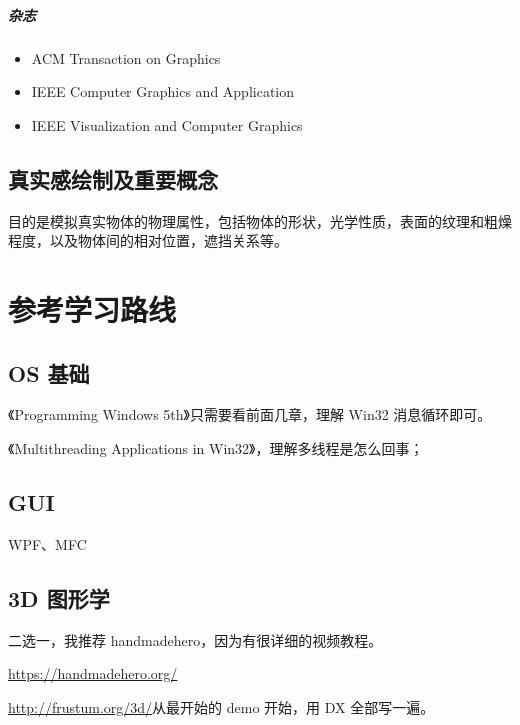 \documentclass[UTF8,a4paper,12pt]{ctexbook}
\begin{document}
		\paragraph{杂志}
			\begin{itemize}
				\item ACM Transaction on Graphics
				\item IEEE Computer Graphics and Application
				\item IEEE Visualization and Computer Graphics
			\end{itemize}


	\section{真实感绘制及重要概念}
		目的是模拟真实物体的物理属性，包括物体的形状，光学性质，表面的纹理和粗燥程度，以及物体间的相对位置，遮挡关系等。
		
			
\chapter{参考学习路线}					
	
	\section{OS 基础}
		《Programming Windows 5th》只需要看前面几章，理解 Win32 消息循环即可。
	
		《Multithreading Applications in Win32》，理解多线程是怎么回事；
	
	\section{GUI}
	 	WPF、MFC
	
	\section{3D 图形学}
		二选一，我推荐 handmadehero，因为有很详细的视频教程。
		
		\url{https://handmadehero.org/}
		
		\url{http://frustum.org/3d/}从最开始的 demo 开始，用 DX 全部写一遍。
	
\end{document}
